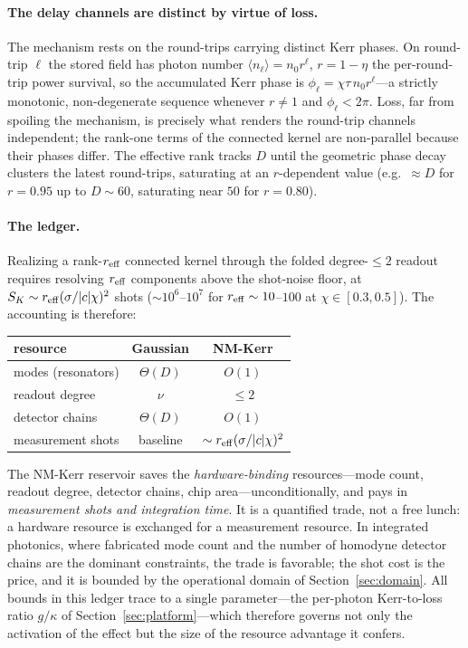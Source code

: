 \documentclass[11pt]{article}
\theoremstyle{remark}
\begin{document}
\paragraph{The delay channels are distinct by virtue of loss.}
The mechanism rests on the round-trips carrying distinct Kerr phases. On round-trip
$\ell$ the stored field has photon number $\langle n_\ell\rangle=n_0 r^{\ell}$,
$r=1-\eta$ the per-round-trip power survival, so the accumulated Kerr phase is
$\phi_\ell=\chi\tau\,n_0 r^{\ell}$---a strictly monotonic, non-degenerate sequence
whenever $r\neq1$ and $\phi_\ell<2\pi$. Loss, far from spoiling the mechanism, is
precisely what renders the round-trip channels independent; the rank-one terms of
the connected kernel are non-parallel because their phases differ. The effective
rank tracks $D$ until the geometric phase decay clusters the latest round-trips,
saturating at an $r$-dependent value (e.g.\ $\approx D$ for $r=0.95$ up to
$D\sim60$, saturating near $50$ for $r=0.80$).

\paragraph{The ledger.}
Realizing a rank-$r_{\rm eff}$ connected kernel through the folded degree-$\le2$
readout requires resolving $r_{\rm eff}$ components above the shot-noise floor, at
$S_K\sim r_{\rm eff}(\sigma/|c|\chi)^2$ shots ($\sim10^{6}$--$10^{7}$ for
$r_{\rm eff}\sim10$--$100$ at $\chi\in[0.3,0.5]$). The accounting is therefore:

\begin{center}
\begin{tabular}{lcc}
\toprule
resource & Gaussian & NM-Kerr \\
\midrule
modes (resonators) & $\Theta(D)$ & $O(1)$ \\
readout degree & $\nu$ & $\le 2$ \\
detector chains & $\Theta(D)$ & $O(1)$ \\
measurement shots & baseline & $\sim r_{\rm eff}(\sigma/|c|\chi)^2$ \\
\bottomrule
\end{tabular}
\end{center}

The NM-Kerr reservoir saves the \emph{hardware-binding} resources---mode count,
readout degree, detector chains, chip area---unconditionally, and pays in
\emph{measurement shots and integration time}. It is a quantified trade, not a free
lunch: a hardware resource is exchanged for a measurement resource. In integrated
photonics, where fabricated mode count and the number of homodyne detector chains
are the dominant constraints, the trade is favorable; the shot cost is the price,
and it is bounded by the operational domain of Section~\ref{sec:domain}. All bounds
in this ledger trace to a single parameter---the per-photon Kerr-to-loss ratio
$g/\kappa$ of Section~\ref{sec:platform}---which therefore governs not only the
activation of the effect but the size of the resource advantage it confers.
\end{document}

